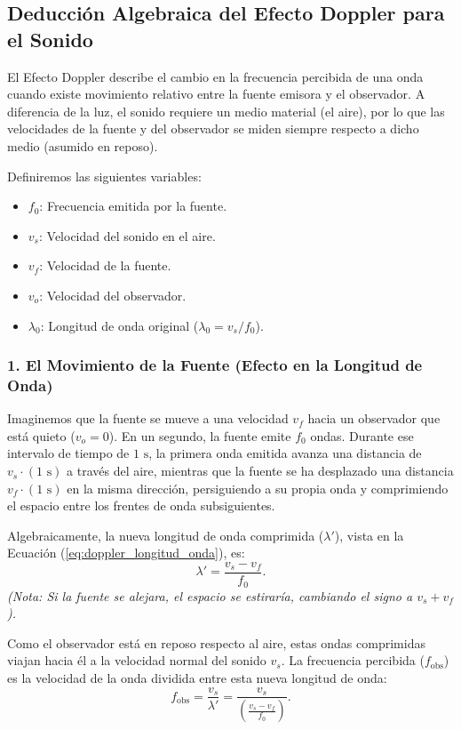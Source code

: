 \documentclass[11pt,a4paper]{book}
\begin{document}
\subsection{Deducción Algebraica del Efecto Doppler para el Sonido}

El Efecto Doppler describe el cambio en la frecuencia percibida de una onda cuando existe movimiento relativo entre la fuente emisora y el observador. A diferencia de la luz, el sonido requiere un medio material (el aire), por lo que las velocidades de la fuente y del observador se miden siempre respecto a dicho medio (asumido en reposo).

Definiremos las siguientes variables:
\begin{itemize}
    \item $f_0$: Frecuencia emitida por la fuente.
    \item $v_s$: Velocidad del sonido en el aire.
    \item $v_f$: Velocidad de la fuente.
    \item $v_o$: Velocidad del observador.
    \item $\lambda_0$: Longitud de onda original ($\lambda_0 = v_s / f_0$).
\end{itemize}

\subsubsection{1. El Movimiento de la Fuente (Efecto en la Longitud de Onda)}

Imaginemos que la fuente se mueve a una velocidad $v_f$ hacia un observador que está quieto ($v_o = 0$). En un segundo, la fuente emite $f_0$ ondas. Durante ese intervalo de tiempo de $1 \text{ s}$, la primera onda emitida avanza una distancia de $v_s \cdot (1 \text{ s})$ a través del aire, mientras que la fuente se ha desplazado una distancia $v_f \cdot (1 \text{ s})$ en la misma dirección, persiguiendo a su propia onda y comprimiendo el espacio entre los frentes de onda subsiguientes.

Algebraicamente, la nueva longitud de onda comprimida ($\lambda'$), vista en la Ecuación (\ref{eq:doppler_longitud_onda}), es:
\begin{equation}
    \lambda' = \frac{v_s - v_f}{f_0}.
    \label{eq:doppler_longitud_onda}
\end{equation}
\textit{(Nota: Si la fuente se alejara, el espacio se estiraría, cambiando el signo a $v_s + v_f$).}

Como el observador está en reposo respecto al aire, estas ondas comprimidas viajan hacia él a la velocidad normal del sonido $v_s$. La frecuencia percibida ($f_{\text{obs}}$) es la velocidad de la onda dividida entre esta nueva longitud de onda:
\begin{equation}
    f_{\text{obs}} = \frac{v_s}{\lambda'} = \frac{v_s}{\left(\frac{v_s - v_f}{f_0}\right)}.
\end{equation}
\end{document}

